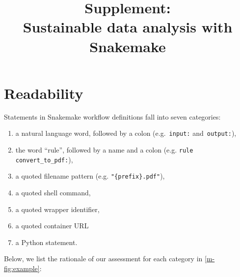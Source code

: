 \documentclass[10pt,a4paper,twocolumn]{article}
\begin{document}
\title{Supplement:\\
Sustainable data analysis with Snakemake}
\maketitle
\thispagestyle{fancy}

\section{Readability}
\label{sec:readability}

Statements in Snakemake workflow definitions fall into seven categories:
\begin{enumerate}
	\item a natural language word, followed by a colon (e.g.~\lstinline!input:! and~\lstinline!output:!),
	\item the word ``rule'', followed by a name and a colon (e.g. \lstinline!rule convert_to_pdf:!),
	\item a quoted filename pattern (e.g. \lstinline!"{prefix}.pdf"!),
	\item a quoted shell command,
	\item a quoted wrapper identifier,
	\item a quoted container URL
	\item a Python statement.
\end{enumerate}

Below, we list the rationale of our assessment for each category in \autoref{m-fig:example}:
\end{document}
